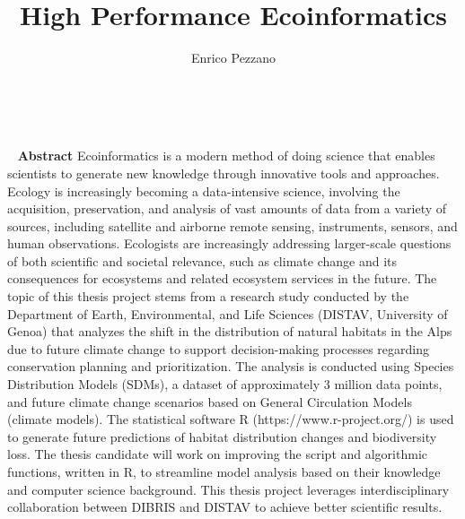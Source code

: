 \documentclass[openright]{masterthesis}
\begin{document}
\title{High Performance Ecoinformatics}
\author{Enrico Pezzano}
\maketitle
~\newpage
\dedication{\textit{DEDICATION}}
~\newpage
\textbf{Abstract} Ecoinformatics is a modern method of doing science that enables scientists to generate new knowledge through innovative tools and approaches. Ecology is increasingly becoming a data-intensive science, involving the acquisition, preservation, and analysis of vast amounts of data from a variety of sources, including satellite and airborne remote sensing, instruments, sensors, and human observations. Ecologists are increasingly addressing larger-scale questions of both scientific and societal relevance, such as climate change and its consequences for ecosystems and related ecosystem services in the future. The topic of this thesis project stems from a research study conducted by the Department of Earth, Environmental, and Life Sciences (DISTAV, University of Genoa) that analyzes the shift in the distribution of natural habitats in the Alps due to future climate change to support decision-making processes regarding conservation planning and prioritization. The analysis is conducted using Species Distribution Models (SDMs), a dataset of approximately 3 million data points, and future climate change scenarios based on General Circulation Models (climate models). The statistical software R (https://www.r-project.org/) is used to generate future predictions of habitat distribution changes and biodiversity loss. The thesis candidate will work on improving the script and algorithmic functions, written in R, to streamline model analysis based on their knowledge and computer science background. This thesis project leverages interdisciplinary collaboration between DIBRIS and DISTAV to achieve better scientific results.


~\newpage~\newpage

\tableofcontents




\nocite{*}


\end{document}
